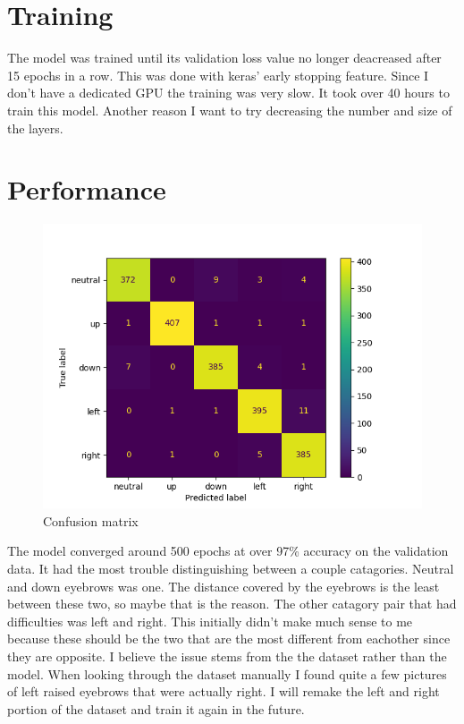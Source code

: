 \documentclass[11pt]{scrartcl} %
\begin{document}
\section{Training}
The model was trained until its validation loss value no longer deacreased after 15 epochs in a row. 
This was done with keras' early stopping feature. Since I don't have a dedicated GPU the training was very slow. 
It took over 40 hours to train this model. Another reason I want to try decreasing the number and size of the layers.

\section{Performance}

\begin{figure}[ht!] %
	\centering
	\includegraphics[width=0.8\columnwidth]{figures/confusionMatrix_RGB.png} 
	\caption{Confusion matrix}
\end{figure}

The model converged around 500 epochs at over 97\% accuracy on the validation data. It had the most trouble distinguishing between a couple catagories. 
Neutral and down eyebrows was one. 
The distance covered by the eyebrows is the least between these two, so maybe that is the reason.
The other catagory pair that had difficulties was left and right.
This initially didn't make much sense to me because these should be the two that are the most different from eachother since they are opposite. I believe the issue stems from the the dataset rather than the model. 
When looking through the dataset manually I found quite a few pictures of left raised eyebrows that were actually right. 
I will remake the left and right portion of the dataset and train it again in the future.
\clearpage
\end{document}
